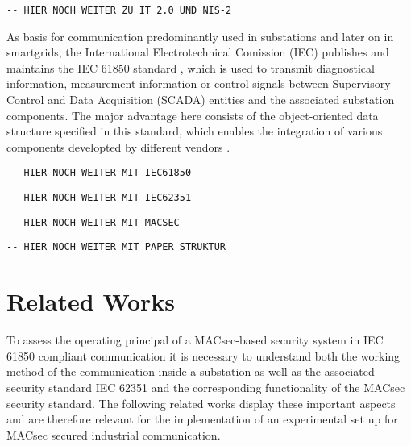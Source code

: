 \documentclass[conference]{IEEEtran}
\begin{document}
\begin{verbatim}
-- HIER NOCH WEITER ZU IT 2.0 UND NIS-2
\end{verbatim}

As basis for communication predominantly used in substations and later on in smartgrids, the International Electrotechnical Comission (IEC) publishes 
and maintains the IEC 61850 standard \cite{IEC61850:2023}, which is used to transmit diagnostical information, measurement information or control signals 
between Supervisory Control and Data Acquisition (SCADA) entities and the associated substation components. The major advantage here consists of the 
object-oriented data structure specified in this standard, which enables the integration of various components developted by different vendors 
\cite[p. 5643]{Review_IEC62351:2019}. 

\begin{verbatim}
-- HIER NOCH WEITER MIT IEC61850
\end{verbatim}

\begin{verbatim}
-- HIER NOCH WEITER MIT IEC62351
\end{verbatim}

\begin{verbatim}
-- HIER NOCH WEITER MIT MACSEC
\end{verbatim}

\begin{verbatim}
-- HIER NOCH WEITER MIT PAPER STRUKTUR
\end{verbatim}

\section{Related Works}
To assess the operating principal of a MACsec-based security system in IEC 61850 compliant communication it is necessary to understand both the working 
method of the communication inside a substation as well as the associated security standard IEC 62351 and the corresponding functionality of the MACsec 
security standard. The following related works display these important aspects and are therefore relevant for the implementation of an experimental set 
up for MACsec secured industrial communication.



\end{document}
